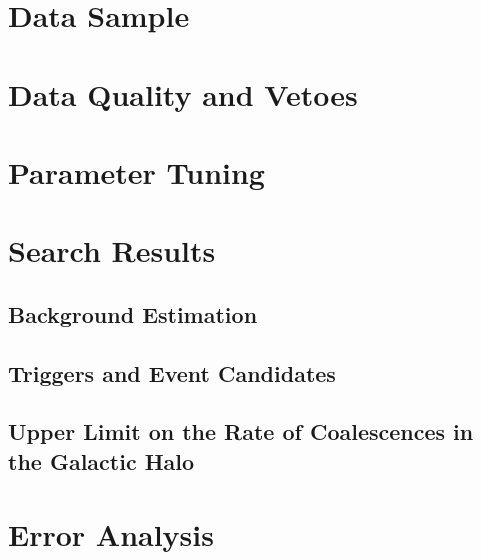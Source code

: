 
\section{Data Sample}

\section{Data Quality and Vetoes}

\section{Parameter Tuning}

\section{Search Results}

\subsection{Background Estimation}

\subsection{Triggers and Event Candidates}

\subsection{Upper Limit on the Rate of Coalescences in the Galactic Halo}

\section{Error Analysis}

